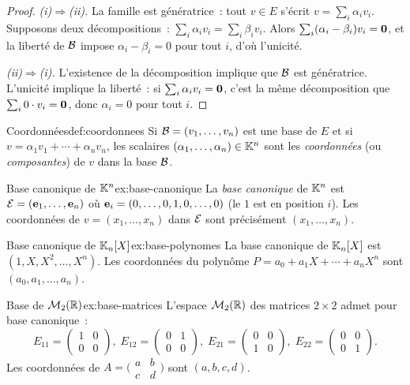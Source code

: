 \begin{proof}
  \emph{(i)$\Rightarrow$(ii).} La famille est génératrice~: tout
  $v\in E$ s'écrit $v=\sum_i\alpha_i v_i$. Supposons deux
  décompositions~: $\sum_i\alpha_i v_i=\sum_i\beta_i v_i$. Alors
  $\sum_i(\alpha_i-\beta_i)v_i=\mathbf{0}$, et la liberté de ${\mathcal{B}}$
  impose $\alpha_i-\beta_i=0$ pour tout $i$, d'où l'unicité.

  \emph{(ii)$\Rightarrow$(i).} L'existence de la décomposition implique
  que ${\mathcal{B}}$ est génératrice. L'unicité implique la liberté~: si
  $\sum_i\alpha_i v_i=\mathbf{0}$, c'est la même décomposition que
  $\sum_i 0\cdot v_i=\mathbf{0}$, donc $\alpha_i=0$ pour tout $i$.
\end{proof}

\begin{definition}{Coordonnées}{def:coordonnees}
  Si ${\mathcal{B}}=(v_1,\ldots,v_n)$ est une base de $E$ et si
  $v=\alpha_1 v_1+\cdots+\alpha_n v_n$, les scalaires
  $(\alpha_1,\ldots,\alpha_n)\in{\mathbb{K}}^n$ sont les \emph{coordonnées}
  (ou \emph{composantes}) de $v$ dans la base ${\mathcal{B}}$.
\end{definition}

\begin{example}{Base canonique de ${\mathbb{K}}^n$}{ex:base-canonique}
  La \emph{base canonique} de ${\mathbb{K}}^n$ est ${\mathcal{E}}=(\mathbf{e}_{1},\ldots,\mathbf{e}_{n})$
  où $\mathbf{e}_{i}=(0,\ldots,0,1,0,\ldots,0)$ (le $1$ est en position $i$).
  Les coordonnées de $v=(x_1,\ldots,x_n)$ dans ${\mathcal{E}}$ sont précisément
  $(x_1,\ldots,x_n)$.
\end{example}

\begin{example}{Base canonique de ${\mathbb{K}}_n[X]$}{ex:base-polynomes}
  La base canonique de ${\mathbb{K}}_n[X]$ est $(1,X,X^2,\ldots,X^n)$. Les
  coordonnées du polynôme $P=a_0+a_1 X+\cdots+a_n X^n$ sont
  $(a_0,a_1,\ldots,a_n)$.
\end{example}

\begin{example}{Base de $\mathcal{M}_{2}({\mathbb{R}})$}{ex:base-matrices}
  L'espace $\mathcal{M}_2({\mathbb{R}})$ des matrices $2\times 2$ admet pour base
  canonique~:
  \[
    E_{11}=\begin{pmatrix}1&0\\0&0\end{pmatrix},\;
    E_{12}=\begin{pmatrix}0&1\\0&0\end{pmatrix},\;
    E_{21}=\begin{pmatrix}0&0\\1&0\end{pmatrix},\;
    E_{22}=\begin{pmatrix}0&0\\0&1\end{pmatrix}.
  \]
  Les coordonnées de
  $A=\bigl(\begin{smallmatrix}a&b\\c&d\end{smallmatrix}\bigr)$ sont
  $(a,b,c,d)$.
\end{example}

